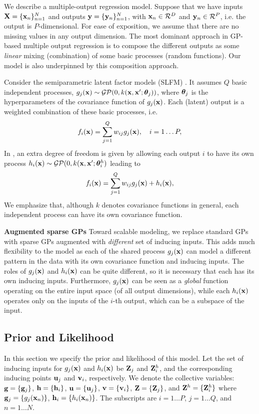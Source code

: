 We describe a multiple-output regression model.
Suppose that we have inputs $\mathbf{X} = \{\mathbf{x}_n\}_{n=1}^N$ and outputs $\mathbf{y} = \{\mathbf{y}_n\}_{n=1}^N$, with $\mathbf{x}_n \in \mathcal{R}^D$ and $\mathbf{y}_n \in \mathcal{R}^P$, i.e. the output is $P$-dimensional.
For ease of exposition, we assume that there are no missing values in any output dimension.
The most dominant approach in GP-based multiple output regression is to compose the different outputs as some \textit{linear} mixing (combination) of some basic processes (random functions).
Our model is also underpinned by this composition approach.

\noindent Consider the semiparametric latent factor models (SLFM) \cite{teh-et-al-aistats-05}.
It assumes $Q$ basic independent processes, $g_j(\mathbf{x}) \sim \mathcal{GP}(0, k(\mathbf{x},\mathbf{x}';\boldsymbol{ \theta }_j))$, where $\boldsymbol{ \theta }_j$ is the hyperparameters of the covariance function of $g_j(\mathbf{x})$.
Each (latent) output is a weighted combination of these basic processes, i.e.
\begin{align}
f_i(\mathbf{x}) = \sum_{j=1}^Q w_{ij} g_j(\mathbf{x}), \quad i = 1 \hdots P,
\end{align}
In \cite{seeger2005semiparametric}, an extra degree of freedom is given by allowing each output $i$ to have its own process $h_i(\mathbf{x}) \sim \mathcal{GP}(0, k(\mathbf{x},\mathbf{x}'; \boldsymbol{ \theta }^h_i)$ leading to
\begin{align}
f_i(\mathbf{x}) = \sum_{j=1}^Q w_{ij} g_j(\mathbf{x}) + h_i(\mathbf{x}), 
\end{align}
We emphasize that, although $k$ denotes covariance functions in general, each independent process can have its own covariance function.

\noindent 
\textbf{Augmented sparse GPs}
Toward scalable modeling, we replace standard GPs with sparse GPs augmented with \textit{different} set of inducing inputs.
This adds much flexibility to the model as each of the shared process $g_j(\mathbf{x})$ can model a different pattern in the data with its own covariance function and inducing inputs. The roles of $g_j(\mathbf{x})$ and $h_i(\mathbf{x})$ can be quite different, so it is necessary that each has its own inducing inputs.
Furthermore, $g_j(\mathbf{x})$ can be seen as a \textit{global} function operating on the entire input space (of all output dimensions), while each $h_i(\mathbf{x})$ operates only on the inputs of the $i$-th output, which can be a subspace of the input.


\subsection{Prior and Likelihood}
In this section we specify the prior and likelihood of this model. 
\newcommand{\Zj}{\Z_j}
\newcommand{\Zhi}{\Z^h_i}
Let the set of inducing inputs for $g_j(\mathbf{x})$ and $h_i(\mathbf{x})$ be $\mathbf{Z}_j$ and $\mathbf{Z}^h_i$, and the corresponding inducing points $\mathbf{u}_j$ and $\mathbf{v}_i$, respectively.
We denote the collective variables: $\mathbf{g} = \{\mathbf{g}_j\}$, $\mathbf{h} = \{\mathbf{h}_i \}$, $\mathbf{u} = \{\mathbf{u}_j\}$, $\mathbf{v} = \{\mathbf{v}_i\}$, $\Z = \{\Zj\}$, and $\Z^h = \{\Zhi \}$ where $\mathbf{g}_j = \{g_j(\mathbf{x}_n)\}$, $\mathbf{h}_i = \{h_i(\mathbf{x}_n)\}$. 
The subscripts are $i = 1 \hdots P$, $j = 1 \hdots Q$, and $n = 1 \hdots N$.

